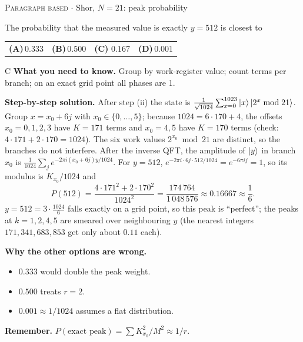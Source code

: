\documentclass[11pt,a4paper]{article}
\newcommand{\optlabel}[1]{\textbf{(#1)}}
\newcommand{\correctlabel}[1]{\textcolor{okgreen}{\textbf{(#1)}\,\ding{51}}}
\newenvironment{qitem}[1]{\begin{list}{}{\setlength{\leftmargin}{3.3em}\setlength{\labelwidth}{3.1em}%
  \setlength{\labelsep}{0.2em}\setlength{\topsep}{3pt}\setlength{\parsep}{3pt}}\item[\textbf{Q.#1}\hfill]}{\end{list}}
\newcommand{\qsep}{\par\vspace{2pt}{\color{black!15}\hrule}\vspace{4pt}}
\newcommand{\qmeta}[2]{{\footnotesize\color{black!60}\textsc{#1} \;$\cdot$\; #2}\par}
\begin{document}
\begin{qitem}{80}
\qmeta{Paragraph based}{Shor, $N = 21$: peak probability}
The probability that the measured value is exactly $y = 512$ is closest to
\par\smallskip\noindent\begin{tabularx}{\linewidth}{@{}*{4}{L}@{}}
\optlabel{A}\,$0.333$ & \optlabel{B}\,$0.500$ & \correctlabel{C}\,$0.167$ & \optlabel{D}\,$0.001$
\end{tabularx}
\end{qitem}
\begin{solbox}{C}
\textbf{\color{brand}What you need to know.} Group by work-register value; count terms per branch; on an exact grid point all phases are 1.

\textbf{\color{brand}Step-by-step solution.} After step (ii) the state is $\frac{1}{\sqrt{1024}}\sum_{x=0}^{1023}\ket{x}\ket{2^x \bmod 21}$. Group $x = x_0 + 6j$ with $x_0 \in \{0, \dots, 5\}$;
because $1024 = 6\cdot170 + 4$, the offsets $x_0 = 0,1,2,3$ have $K = 171$ terms and $x_0 = 4,5$ have $K = 170$ terms
(check: $4\cdot171 + 2\cdot170 = 1024$). The six work values $2^{x_0} \bmod 21$ are distinct, so the branches do not interfere. After
the inverse QFT, the amplitude of $\ket{y}$ in branch $x_0$ is $\frac{1}{1024}\sum_{j}e^{-2\pi i(x_0 + 6j)y/1024}$. For $y = 512$,
$e^{-2\pi i\cdot6j\cdot512/1024} = e^{-6\pi i j} = 1$, so its modulus is $K_{x_0}/1024$ and
\[ P(512) = \frac{4\cdot171^2 + 2\cdot170^2}{1024^2} = \frac{174\,764}{1\,048\,576} \approx 0.16667 \approx \frac16 . \]
$y = 512 = 3\cdot\frac{1024}{6}$ falls exactly on a grid point, so this peak is ``perfect''; the peaks at $k = 1, 2, 4, 5$ are smeared
over neighbouring $y$ (the nearest integers $171, 341, 683, 853$ get only about $0.11$ each).

\textbf{\color{brand}Why the other options are wrong.}
\begin{itemize}[leftmargin=2.4em, itemsep=1pt, topsep=2pt]
\item[\textbf{(A)}] $0.333$ would double the peak weight.
\item[\textbf{(B)}] $0.500$ treats $r = 2$.
\item[\textbf{(D)}] $0.001 \approx 1/1024$ assumes a flat distribution.
\end{itemize}
\textbf{\color{brand}Remember.} $P(\text{exact peak}) = \sum K_{x_0}^2/M^2 \approx 1/r$.
\end{solbox}
\qsep
\end{document}
